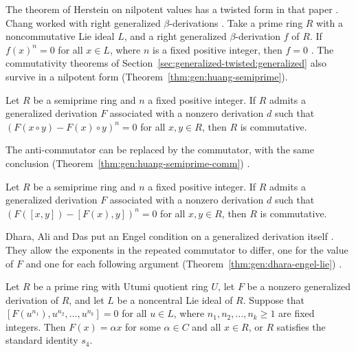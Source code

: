 The theorem of Herstein on nilpotent values has a twisted form in that paper
\cite[p.~893]{Huang2018}. Chang worked with right generalized
$\beta$-derivations \cite[p.~893]{Huang2018}. Take a prime ring $R$ with a
noncommutative Lie ideal $L$, and a right generalized $\beta$-derivation $f$
of $R$. If $f(x)^{n}=0$ for all $x\in L$, where $n$ is a fixed positive
integer, then $f=0$ \cite[p.~893]{Huang2018}. The commutativity theorems of
Section~\ref{sec:generalized-twisted:generalized} also survive in a nilpotent
form \cite[pp.~893--894]{Huang2018} (Theorem~\ref{thm:gen:huang-semiprime}).

\begin{theorem}\label{thm:gen:huang-semiprime}
Let $R$ be a semiprime ring and $n$ a fixed positive integer. If $R$ admits
a generalized derivation $F$ associated with a nonzero derivation $d$ such
that $(F(x\circ y)-F(x)\circ y)^{n}=0$ for all $x,y\in R$, then $R$ is
commutative.
\end{theorem}

The anti-commutator can be replaced by the commutator, with the same
conclusion (Theorem~\ref{thm:gen:huang-semiprime-comm})
\cite[p.~894]{Huang2018}.

\begin{theorem}\label{thm:gen:huang-semiprime-comm}
Let $R$ be a semiprime ring and $n$ a fixed positive integer. If $R$ admits
a generalized derivation $F$ associated with a nonzero derivation $d$ such
that $(F([x,y])-[F(x),y])^{n}=0$ for all $x,y\in R$, then $R$ is
commutative.
\end{theorem}

Dhara, Ali and Das put an Engel condition on a generalized derivation itself
\cite[p.~1]{DharaAliDas2016}. They allow the exponents in the repeated commutator
to differ, one for the value of $F$ and one for each following argument (Theorem~\ref{thm:gen:dhara-engel-lie})
\cite[p.~1]{DharaAliDas2016}.\begin{theorem}\label{thm:gen:dhara-engel-lie}
Let $R$ be a prime ring with Utumi quotient ring $U$, let $F$ be a nonzero
generalized derivation of $R$, and let $L$ be a noncentral Lie ideal of $R$.
Suppose that $[F(u^{n_{1}}),u^{n_{2}},\dots,u^{n_{k}}]=0$ for all $u\in L$, where
$n_{1},n_{2},\dots,n_{k}\ge 1$ are fixed integers. Then $F(x)=\alpha x$ for some
$\alpha\in C$ and all $x\in R$, or $R$ satisfies the standard identity $s_{4}$.
\end{theorem}

